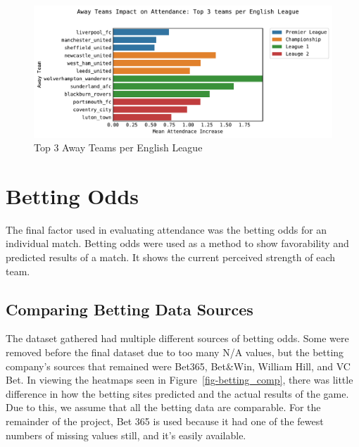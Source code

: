 \documentclass[
  letterpaper,
  DIV=11,
  numbers=noendperiod]{scrartcl}
\begin{document}
\begin{figure}[H]

{\centering \includegraphics{Blog_post_files/figure-pdf/fig-england_away-output-1.pdf}

}

\caption{\label{fig-england_away}Top 3 Away Teams per English League}

\end{figure}

\hypertarget{betting-odds}{%
\section{Betting Odds}\label{betting-odds}}

The final factor used in evaluating attendance was the betting odds for
an individual match. Betting odds were used as a method to show
favorability and predicted results of a match. It shows the current
perceived strength of each team.

\hypertarget{comparing-betting-data-sources}{%
\subsection{Comparing Betting Data
Sources}\label{comparing-betting-data-sources}}

The dataset gathered had multiple different sources of betting odds.
Some were removed before the final dataset due to too many N/A values,
but the betting company's sources that remained were Bet365, Bet\&Win,
William Hill, and VC Bet. In viewing the heatmaps seen in
Figure~\ref{fig-betting_comp}, there was little difference in how the
betting sites predicted and the actual results of the game. Due to this,
we assume that all the betting data are comparable. For the remainder of
the project, Bet 365 is used because it had one of the fewest numbers of
missing values still, and it's easily available.
\end{document}
